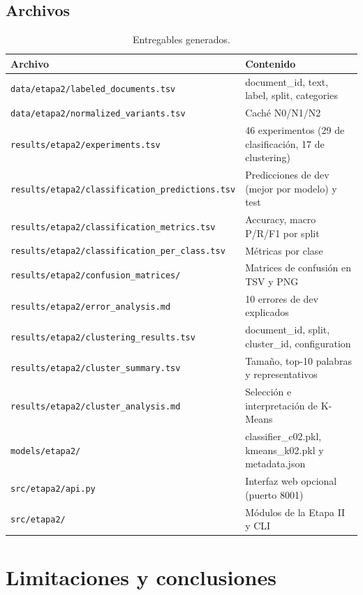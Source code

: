 \documentclass[11pt,a4paper]{article}
\newcommand{\code}[1]{\texttt{#1}}
\begin{document}
\subsection{Archivos}
\begin{table}[htbp]
\centering
\small
\caption{Entregables generados.}
\label{tab:archivos}
\footnotesize
\begin{tabular}{@{}p{7.0cm}p{7.0cm}@{}}
\toprule
Archivo & Contenido\\
\midrule
\code{data/etapa2/labeled\_documents.tsv} & document\_id, text, label, split, categories\\
\code{data/etapa2/normalized\_variants.tsv} & Caché N0/N1/N2\\
\code{results/etapa2/experiments.tsv} & 46 experimentos (29 de clasificación, 17 de clustering)\\
\code{results/etapa2/}\newline\code{classification\_predictions.tsv} & Predicciones de dev (mejor por modelo) y test\\
\code{results/etapa2/}\newline\code{classification\_metrics.tsv} & Accuracy, macro P/R/F1 por split\\
\code{results/etapa2/}\newline\code{classification\_per\_class.tsv} & Métricas por clase\\
\code{results/etapa2/confusion\_matrices/} & Matrices de confusión en TSV y PNG\\
\code{results/etapa2/error\_analysis.md} & 10 errores de dev explicados\\
\code{results/etapa2/clustering\_results.tsv} & document\_id, split, cluster\_id, configuration\\
\code{results/etapa2/cluster\_summary.tsv} & Tamaño, top-10 palabras y representativos\\
\code{results/etapa2/cluster\_analysis.md} & Selección e interpretación de K-Means\\
\code{models/etapa2/} & classifier\_c02.pkl, kmeans\_k02.pkl y metadata.json\\
\code{src/etapa2/api.py} & Interfaz web opcional (puerto 8001)\\
\code{src/etapa2/} & Módulos de la Etapa II y CLI\\
\bottomrule
\end{tabular}
\end{table}

\section{Limitaciones y conclusiones}
\end{document}
